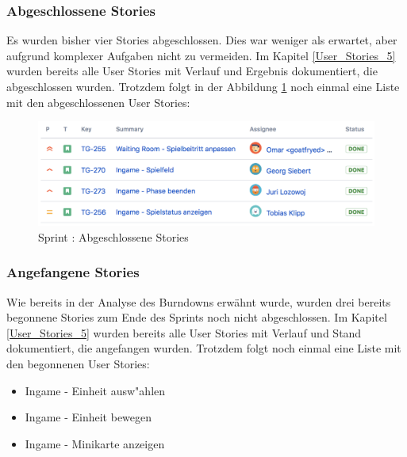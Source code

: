 \documentclass[12pt, titlepage]{scrartcl}
\newcommand{\RN}[1]{%
	\textup{\uppercase\expandafter{\romannumeral#1}}%
}
\begin{document}
        	\subsubsection{Abgeschlossene Stories} \label{done_stories_5}
        		Es wurden bisher vier Stories abgeschlossen. Dies war weniger als erwartet, aber aufgrund komplexer Aufgaben nicht zu vermeiden. Im Kapitel \ref{User_Stories_5} wurden bereits alle User Stories mit Verlauf und Ergebnis dokumentiert, die abgeschlossen wurden. Trotzdem folgt in der Abbildung \ref{Done_5} noch einmal eine Liste mit den abgeschlossenen User Stories:
        		\begin{figure}[H] 
        			\centering
        			\includegraphics[width=\textwidth]{images/sprintV/doneIssues.png}
        			\caption{Sprint \RN{5}: Abgeschlossene Stories}
        			\label{Done_5}
        		\end{figure}
        	\subsubsection{Angefangene Stories}
        		Wie bereits in der Analyse des Burndowns erw\"ahnt wurde, wurden drei bereits begonnene Stories zum Ende des Sprints noch nicht abgeschlossen. Im Kapitel \ref{User_Stories_5} wurden bereits alle User Stories mit Verlauf und Stand dokumentiert, die angefangen wurden. Trotzdem folgt noch einmal eine Liste mit den begonnenen User Stories:
        		\begin{itemize}
        			\item Ingame - Einheit ausw"ahlen
        			\item Ingame - Einheit bewegen
        			\item Ingame - Minikarte anzeigen
        		\end{itemize}
\end{document}
